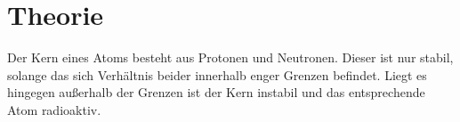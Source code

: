 
\section{Theorie}
\label{sec:Theorie}
Der Kern eines Atoms besteht aus Protonen und Neutronen. Dieser ist nur stabil, solange das sich Verhältnis beider innerhalb enger Grenzen befindet. Liegt es hingegen außerhalb der Grenzen ist der Kern instabil und das entsprechende Atom radioaktiv. 



